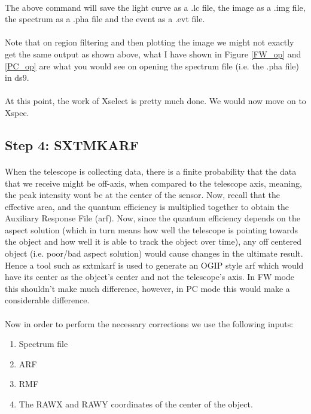 \documentclass[a4paper,twoside]{report}
\numberwithin{equation}{section}
\begin{document}
\paragraph{}
The above command will save the light curve as a .lc file, the image as a .img file, the spectrum as a .pha file and the event as a .evt file. 
\paragraph{}
Note that on region filtering and then plotting the image we might not exactly get the same output as shown above, what I have shown in Figure \ref{FW_op} and \ref{PC_op} are what you would see on opening the spectrum file (i.e. the .pha file) in ds$9$. 
\paragraph{}
At this point, the work of Xselect is pretty much done. We would now move on to Xspec. 
\subsection{Step 4: SXTMKARF}
\paragraph{}
When the telescope is collecting data, there is a finite probability that the data that we receive might be off-axis, when compared to the telescope axis, meaning, the peak intensity wont be at the center of the sensor. Now, recall that the effective area, and the quantum efficiency is multiplied together to obtain the Auxiliary Response File (arf). Now, since the quantum efficiency depends on the aspect solution (which in turn means how well the telescope is pointing towards the object and how well it is able to track the object over time), any off centered object (i.e. poor/bad aspect solution) would cause changes in the ultimate result. Hence a tool such as sxtmkarf is used to generate an OGIP style arf which would have its center as the object's center and not the telescope's axis. In FW mode this shouldn't make much difference, however, in PC mode this would make a considerable difference. 
\paragraph{}
Now in order to perform the necessary corrections we use the following inputs:
\begin{enumerate}
\item Spectrum file 
\item ARF 
\item RMF 
\item The RAWX and RAWY coordinates of the center of the object.
\end{enumerate}
\end{document}
